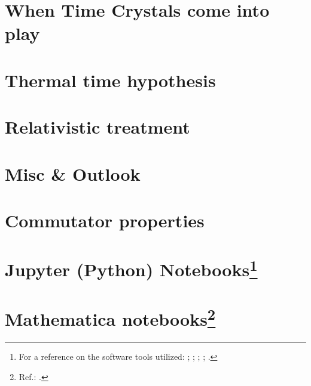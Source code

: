 \iftodo
\chapter{When Time Crystals come into play}

\fi

\iftodo
\chapter{Thermal time hypothesis}

\fi

\chapter{Relativistic treatment}

\iftodo

\fi

\iftodo
\chapter{Misc \& Outlook}

\fi

\appendix

\chapter{Commutator properties}


\chapter[Jupyter (Python) Notebooks]{Jupyter (Python) Notebooks\footnote{
  For a reference on the software tools utilized:
  \cite{comp:scipy};
  \cite{comp:sympy};
  \cite{comp:jupyter};
  \cite{comp:matplotlib};
  \cite{comp:numpy}.
}}




\chapter[Mathematica notebooks]{Mathematica notebooks\footnote{
  Ref.: \cite{Wolfram}.
}}



\printbibliography[heading=bibintoc]


